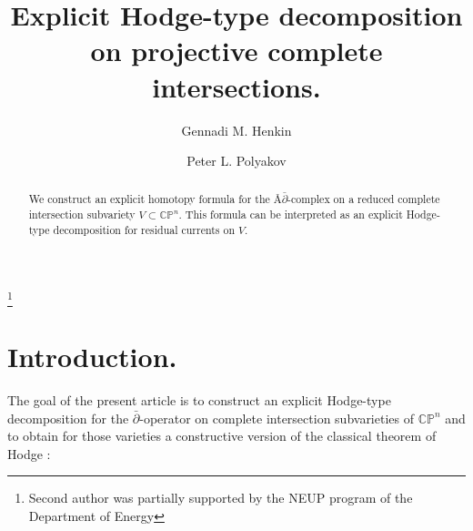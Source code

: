 \documentclass[11pt,reqno]{amsart}
\numberwithin{equation}{section}
\begin{document}
\title[Explicit Hodge-type decomposition]
{Explicit Hodge-type decomposition on projective complete intersections.}

\author{Gennadi M. Henkin}
\address{Institut de Mathematiques \\ Universite Pierre et Marie Curie \\ 75252 BC247 Paris \\
Cedex 05 \\ France, and CEMI  Acad. Sc. \\ 117418 \\ Moscow, Russia}
\curraddr{}

\author{Peter L. Polyakov}
\address{University of Wyoming \\ Department of Mathematics \\ 1000 E University Ave
\\ Laramie, WY 82071}
\curraddr{}
\thanks{Second author was partially supported by the NEUP program of
the Department of Energy}




\begin{abstract}
We construct an explicit homotopy formula for the Â$\bar\partial$-complex
on a reduced complete intersection subvariety $V\subset{{\mathbb C}}{{\mathbb P}}^n$.
This formula can be interpreted as an explicit Hodge-type decomposition for residual
currents on $V$.
\end{abstract}

\maketitle

\section{Introduction.}\label{Introduction}

The goal of the present article is to construct an explicit Hodge-type decomposition
for the $\bar\partial$-operator on complete intersection subvarieties of ${{\mathbb C}}{{\mathbb P}}^n$
and to obtain for those varieties a constructive version of the
classical theorem of Hodge \cite{Ho, Wy, Kd}:
\end{document}
